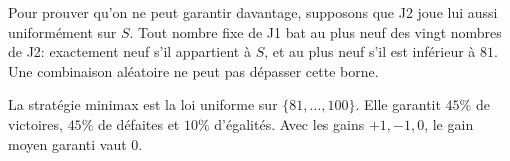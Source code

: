 \documentclass[11pt,a4paper]{article}
\begin{document}
Pour prouver qu'on ne peut garantir davantage, supposons que J2 joue lui aussi
uniformément sur $S$. Tout nombre fixe de J1 bat au plus neuf des vingt nombres
de J2: exactement neuf s'il appartient à $S$, et au plus neuf s'il est
inférieur à $81$. Une combinaison aléatoire ne peut pas dépasser cette borne.

\begin{resultbox}
La stratégie minimax est la loi uniforme sur $\{81,\ldots,100\}$. Elle garantit
$45\%$ de victoires, $45\%$ de défaites et $10\%$ d'égalités. Avec les gains
$+1,-1,0$, le gain moyen garanti vaut $0$.
\end{resultbox}
\end{document}
